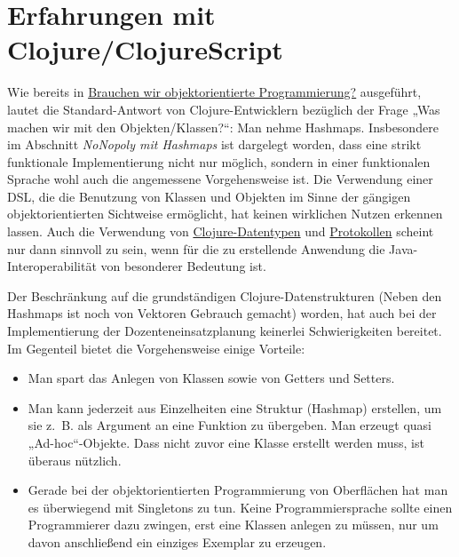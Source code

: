 \documentclass[11pt]{article}
\begin{document}
\section*{Erfahrungen mit Clojure/ClojureScript}
\label{sec:orgf35563c}
Wie bereits in \href{https://www.dropbox.com/s/36vsbdk1bn4w17o/oop-wozu.pdf?dl=0}{Brauchen wir objektorientierte Programmierung?}
ausgeführt, lautet die Standard-Antwort von Clojure-Entwicklern
bezüglich der Frage „Was machen wir mit den Objekten/Klassen?“: Man
nehme Hashmaps. Insbesondere im Abschnitt \emph{NoNopoly mit Hashmaps} ist
dargelegt worden, dass eine strikt funktionale Implementierung nicht
nur möglich, sondern in einer funktionalen Sprache wohl auch die
angemessene Vorgehensweise ist. Die Verwendung einer DSL, die die
Benutzung von Klassen und Objekten im Sinne der gängigen
objektorientierten Sichtweise ermöglicht, hat keinen wirklichen Nutzen
erkennen lassen. Auch die Verwendung von \href{https://clojure.org/reference/datatypes}{Clojure-Datentypen} und
\href{https://clojure.org/reference/protocols}{Protokollen} scheint nur dann sinnvoll zu sein, wenn für die zu
erstellende Anwendung die Java-Interoperabilität von besonderer
Bedeutung ist.

Der Beschränkung auf die grundständigen Clojure-Datenstrukturen (Neben
den Hashmaps ist noch von Vektoren Gebrauch gemacht) worden, hat auch bei
der Implementierung der Dozenteneinsatzplanung keinerlei
Schwierigkeiten bereitet. Im Gegenteil bietet die Vorgehensweise
einige Vorteile:

\begin{itemize}
\item Man spart das Anlegen von Klassen sowie von Getters und Setters.
\item Man kann jederzeit aus Einzelheiten eine Struktur (Hashmap)
erstellen, um sie z.~B. als Argument an eine Funktion zu
übergeben. Man erzeugt quasi „Ad-hoc“-Objekte. Dass nicht zuvor eine
Klasse erstellt werden muss, ist überaus nützlich.
\item Gerade bei der objektorientierten Programmierung von Oberflächen hat man
es überwiegend mit Singletons zu tun. Keine Programmiersprache
sollte einen Programmierer dazu zwingen, erst eine Klassen anlegen
zu müssen, nur um davon anschließend ein einziges Exemplar zu erzeugen.
\end{itemize}
\end{document}
